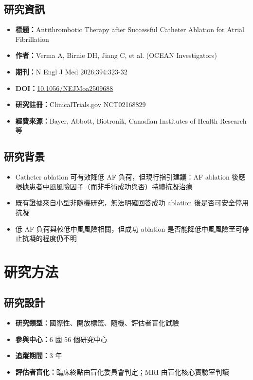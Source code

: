 \documentclass[12pt,a4paper]{article}
\begin{document}
\subsection{研究資訊}

\begin{itemize}
    \item \textbf{標題：}Antithrombotic Therapy after Successful Catheter Ablation for Atrial Fibrillation
    \item \textbf{作者：}Verma A, Birnie DH, Jiang C, et al. (OCEAN Investigators)
    \item \textbf{期刊：}N Engl J Med 2026;394:323-32
    \item \textbf{DOI：}\href{https://doi.org/10.1056/NEJMoa2509688}{10.1056/NEJMoa2509688}
    \item \textbf{研究註冊：}ClinicalTrials.gov NCT02168829
    \item \textbf{經費來源：}Bayer, Abbott, Biotronik, Canadian Institutes of Health Research 等
\end{itemize}

\subsection{研究背景}

\begin{itemize}
    \item Catheter ablation 可有效降低 AF 負荷，但現行指引建議：AF ablation 後應根據患者中風風險因子（而非手術成功與否）持續抗凝治療
    \item 既有證據來自小型非隨機研究，無法明確回答成功 ablation 後是否可安全停用抗凝
    \item 低 AF 負荷與較低中風風險相關，但成功 ablation 是否能降低中風風險至可停止抗凝的程度仍不明
\end{itemize}

\section{研究方法}

\subsection{研究設計}

\begin{itemize}
    \item \textbf{研究類型：}國際性、開放標籤、隨機、評估者盲化試驗
    \item \textbf{參與中心：}6 國 56 個研究中心
    \item \textbf{追蹤期間：}3 年
    \item \textbf{評估者盲化：}臨床終點由盲化委員會判定；MRI 由盲化核心實驗室判讀
\end{itemize}
\end{document}
